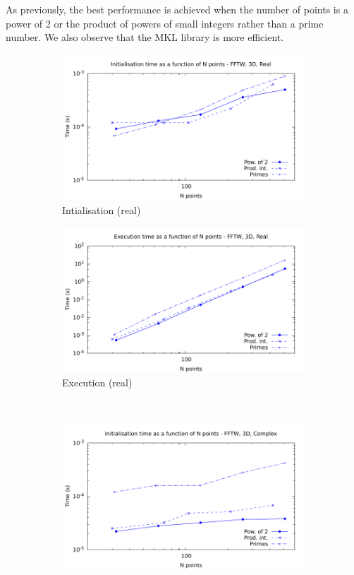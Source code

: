 \documentclass[12pt, a4paper]{article}
\begin{document}
As previously, the best performance is achieved when the number of points is a power of 2 or the product of powers of small integers rather than a prime number. We also observe that the MKL library is more efficient.
\begin{figure}[H]
\captionsetup{width=0.8\linewidth}
\centering
\begin{subfigure}{.5\textwidth}
\centering
\includegraphics[width=.9\linewidth]{graphs/3d-fftw-init-r.pdf}
\caption{Intialisation (real)}
\label{3DFFTWRI}
\end{subfigure}%
\begin{subfigure}{.5\textwidth}
\centering
\includegraphics[width=.9\linewidth]{graphs/3d-fftw-exec-r.pdf}
\caption{Execution (real)}
\label{3DFFTWR}
\end{subfigure}\\
\begin{subfigure}{.5\textwidth}
\centering
\includegraphics[width=.9\linewidth]{graphs/3d-fftw-init-c.pdf}

\end{subfigure}
\end{figure}
\end{document}

